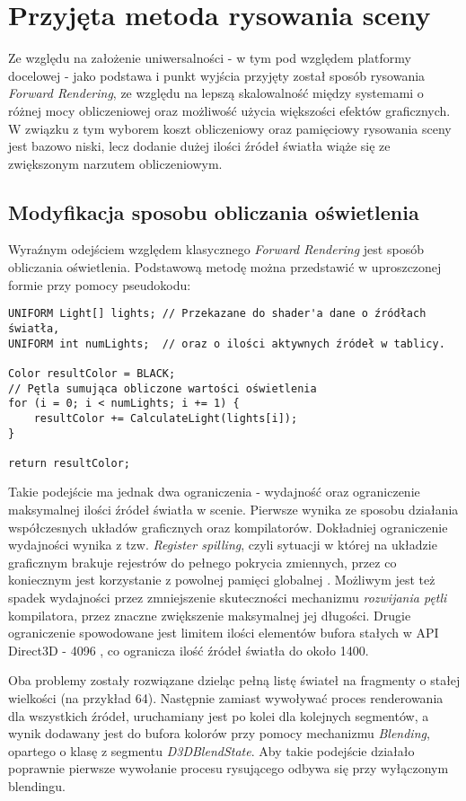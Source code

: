 \chapter{Przyjęta metoda rysowania sceny}
\label{ChapterSceneDrawingMethod}
	Ze względu na założenie uniwersalności - w tym pod względem platformy docelowej - jako podstawa i punkt wyjścia przyjęty został sposób rysowania \textit{Forward Rendering}, ze względu na lepszą skalowalność między systemami o różnej mocy obliczeniowej oraz możliwość użycia większości efektów graficznych. W związku z tym wyborem koszt obliczeniowy oraz pamięciowy rysowania sceny jest bazowo niski, lecz dodanie dużej ilości źródeł światła wiąże się ze zwiększonym narzutem obliczeniowym.
	
\section{Modyfikacja sposobu obliczania oświetlenia}
	Wyraźnym odejściem względem klasycznego \textit{Forward Rendering} jest sposób obliczania oświetlenia. Podstawową metodę można przedstawić w uproszczonej formie przy pomocy pseudokodu:
	
	\begin{lstlisting}[label={lst:shaderForwardLightCalculations}]
UNIFORM Light[] lights; // Przekazane do shader'a dane o źródłach światła,
UNIFORM int numLights;  // oraz o ilości aktywnych źródeł w tablicy.
		
Color resultColor = BLACK;
// Pętla sumująca obliczone wartości oświetlenia
for (i = 0; i < numLights; i += 1) {
    resultColor += CalculateLight(lights[i]);
}

return resultColor;
	\end{lstlisting}
	
	Takie podejście ma jednak dwa ograniczenia - wydajność oraz ograniczenie maksymalnej ilości źródeł światła w scenie.	Pierwsze wynika ze sposobu działania współczesnych układów graficznych oraz kompilatorów. Dokładniej ograniczenie wydajności wynika z tzw. \textit{Register spilling}, czyli sytuacji w której na układzie graficznym brakuje rejestrów do pełnego pokrycia zmiennych, przez co koniecznym jest korzystanie z powolnej pamięci globalnej \cite{amd:gpuopen:RegisterSpilling}. Możliwym jest też spadek wydajności przez zmniejszenie skuteczności mechanizmu \textit{rozwijania pętli} kompilatora, przez znaczne zwiększenie maksymalnej jej długości. Drugie ograniczenie spowodowane jest limitem ilości elementów bufora stałych w API Direct3D - 4096 \cite{microsoft:Direct3D11:ResourceLimits}, co ogranicza ilość źródeł światła do około 1400. 
	
	Oba problemy zostały rozwiązane dzieląc pełną listę świateł na fragmenty o stałej wielkości (na przykład 64). Następnie zamiast wywoływać proces renderowania dla wszystkich źródeł, uruchamiany jest po kolei dla kolejnych segmentów, a wynik dodawany jest do bufora kolorów przy pomocy mechanizmu \textit{Blending}, opartego o klasę z segmentu \textit{D3DBlendState}. Aby takie podejście działało poprawnie pierwsze wywołanie procesu rysującego odbywa się przy wyłączonym blendingu.